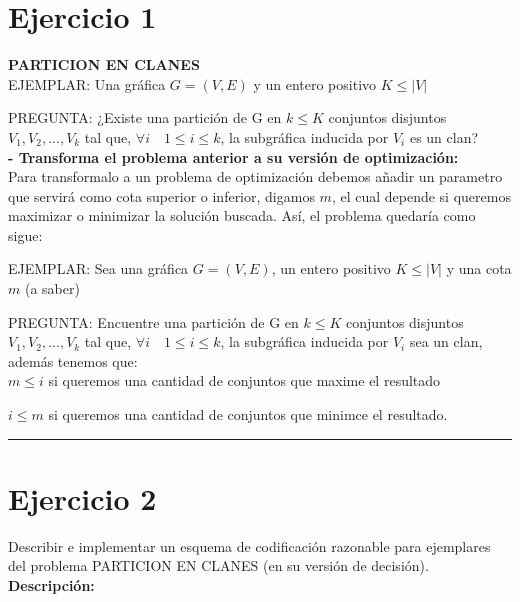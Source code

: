 \documentclass[12pt,letterpaper]{article}
\newcommand{\lineaxd}{{\color{brown}\rule{\linewidth}{0.5mm}}}
\begin{document}
\section*{Ejercicio 1}

\textbf{PARTICION EN CLANES}\\

EJEMPLAR: Una gráfica $G = (V, E)$ y un entero positivo $K \leq |V |$

PREGUNTA: ¿Existe una partición de G en $k \leq K$ conjuntos disjuntos $V_1, V_2, ... , V_k$ tal que, $\forall i\quad 1 \leq i \leq k$, la subgráfica inducida por $V_i$ es un clan?\\

\textbf{- Transforma el problema anterior a su versión de optimización:}\\

Para transformalo a un problema de optimización debemos añadir un parametro que servirá como cota superior o inferior, digamos $m$, el cual depende si queremos maximizar o minimizar la solución buscada. Así, el problema quedaría como sigue: 



EJEMPLAR: Sea una gráfica $G = (V, E)$, un entero positivo $K \leq |V|$ y una cota $m$ (a saber) 

PREGUNTA: Encuentre una partición de G en $k \leq K$ conjuntos disjuntos $V_1, V_2, ... , V_k$ tal que, $\forall i\quad 1 \leq i \leq k$, la subgráfica inducida por $V_i$ sea un clan, además tenemos que:\\

$m \leq i$ si queremos una cantidad de conjuntos que maxime el resultado

$i \leq m$ si queremos una cantidad de conjuntos que minimce el resultado.

\lineaxd

\section*{Ejercicio 2}

Describir e implementar un esquema de codificación razonable para ejemplares del problema PARTICION EN CLANES (en su versión de decisión).\\

\textbf{Descripción:}
\end{document}
